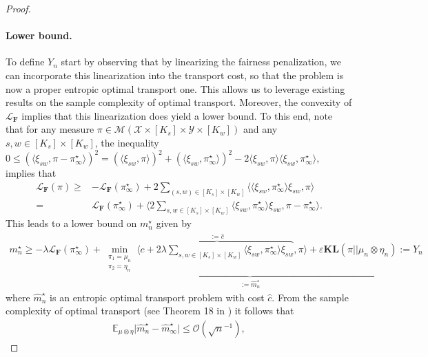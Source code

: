 \documentclass{article}
\newcommand{\kl}{\mathbf{KL}}
\theoremstyle{definition}
\begin{document}
\begin{proof}
\paragraph{Lower bound.} To define $Y_n$ start by observing that 
by linearizing the fairness penalization, we can incorporate this linearization into the transport cost, so that the problem is now a proper entropic optimal transport one. 
This allows us to leverage existing results on the sample complexity of optimal transport.
Moreover, the convexity of $\mathcal{L}_\mathbf{F}$ implies that this linearization   does yield  a lower bound. To this end, note that for any measure $\pi\in \mathcal{M}(\mathcal{X}\times [K_s] \times \mathcal{Y}\times [K_w])$ and any $s,w\in [K_s] \times [K_w]$, the inequality $0\leq (\langle \xi_{sw},\pi-\pi^\star_\infty\rangle)^2= (\langle \xi_{sw},\pi\rangle)^2+(\langle \xi_{sw},\pi_\infty^\star\rangle)^2-2 \langle \xi_{sw},\pi\rangle\langle \xi_{sw},\pi^\star_\infty\rangle,$ implies that 
\begin{align*}
    \mathcal{L}_\mathbf{F}(\pi)
    \geq & -\mathcal{L}_\mathbf{F}(\pi_\infty^\star)+2\sum_{(s,w)\in [K_s] \times [K_w]}\big\langle \langle \xi_{sw},\pi^\star_\infty\rangle \xi_{sw},\pi\big\rangle\\\label{eq:firstOrderCvxIneq2}
    = & \mathcal{L}_\mathbf{F}(\pi^\star_\infty)+\big\langle 2\sum_{s,w\in [K_s] \times [K_w]}\langle \xi_{sw},\pi^\star_\infty\rangle \xi_{sw},\pi-\pi^\star_\infty\big\rangle.
\end{align*}
This leads to a lower bound on $m_n^\star$ given by
\begin{equation}\label{eq:cvxFairOT_OTlowerbound}
\begin{aligned}
    m_n^\star\geq  - \lambda\mathcal{L}_\mathbf{F}(\pi_\infty^\star)+\underbrace{\min_{\substack{\pi_1=\mu_n\\
    \pi_2=\eta_n}} \langle \overbrace{c+2\lambda\sum_{s,w\in [K_s] \times [K_w]} \langle\xi_{sw},\pi_\infty^\star\rangle \xi_{sw}}^{:=\widehat{c}},\pi\rangle+\varepsilon \kl(\pi||\mu_n\otimes \eta_n)}_{:=\hat m_n^\star}:=Y_n
\end{aligned}
\end{equation}
where $\widehat m_n^\star$ is an  entropic optimal transport problem with cost $\widehat{c}$. From the sample complexity of optimal transport (see Theorem 18 in \cite{genevay2019entropy})  it follows that 
\begin{align}\label{eq:sampleComplexity_eOT}
\mathbb{E}_{\mu\otimes \eta}\big|\widehat{m}_n^\star-\widehat{m}_\infty^\star\big|\leq \mathcal{O}(\sqrt{n}^{-1}),

\end{align}
\end{proof}
\end{document}
